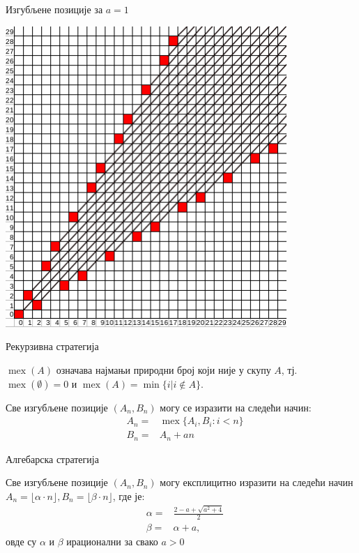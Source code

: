 \documentclass[10pt]{beamer}
\DeclareMathOperator{\mex}{mex}
\begin{document}
\begin{frame}{Изгубљене позиције за $ a = 1 $}
\begin{center}
\begin{minipage}[t]{.80\linewidth}
				\includegraphics[width=0.8\textwidth]{../src/statistics/picture/p_positions_a=1.png}
			\end{minipage}
		\end{center}
	\end{frame}
	
	\begin{frame}{Рекурзивна стратегија}
		\begin{tcolorbox}[title=Дефиниција оператора $ \mex $]
			$\mex(A)$ означава најмањи природни број који није у скупу $ A $, тј. $ \mex(\emptyset)=0 $ и
			$ \mex(A)=\min\{i | i\notin A\} $.
		\end{tcolorbox}
	
	    \begin{tcolorbox}[title=Рекурзивна карактеризација изгубљених позиција]
	    	Све изгубљене позиције $ (A_{n}, B_{n}) $ могу се изразити на следећи начин:
	    	\begin{eqnarray}
		    	&A_{n} = &\mex \{ A_{i}, B_{i} : i < n \}\\
		    	&B_{n} = &A_{n} + an
	    	\end{eqnarray}
	    \end{tcolorbox}
	\end{frame}

	\begin{frame}{Алгебарска стратегија}
		\begin{tcolorbox}[title=Алгебарска карактеризација изгубљених позиција]
			Све изгубљене позиције $ (A_{n}, B_{n}) $ могу експлицитно изразити на следећи начин $ A_{n} = \lfloor \alpha \cdot n \rfloor, B_{n} = \lfloor \beta \cdot n \rfloor $, где је:
			\begin{eqnarray}
				&\alpha = &\frac{2 - a + \sqrt{a^2 + 4}}{2} \label{def:alpha}\\  
				&\beta = &\alpha + a \label{def:beta},
			\end{eqnarray}
	    	овде су $ \alpha $ и $ \beta $ ирационални за свако $ a > 0 $
		\end{tcolorbox}
	\end{frame}
	
\end{document}
